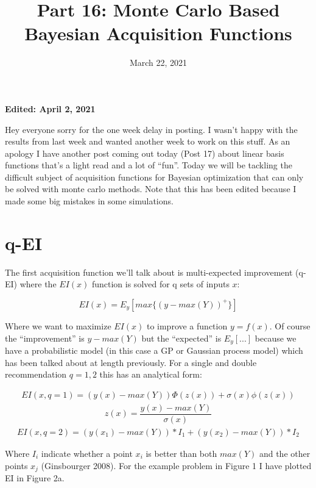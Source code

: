 \documentclass[12pt]{article}
\title{Part 16: Monte Carlo Based Bayesian Acquisition Functions}
\begin{document}
\date{March 22, 2021}
\maketitle

\textbf{Edited: April 2, 2021}

Hey everyone sorry for the one week delay in posting. I wasn't happy with the results from last week and wanted another week to work on this stuff. As an apology I have another post coming out today (Post 17) about linear basis functions that's a light read and a lot of ``fun''. Today we will be tackling the difficult subject of acquisition functions for Bayesian optimization that can only be solved with monte carlo methods. Note that this has been edited because I made some big mistakes in some simulations.

\section{q-EI}

The first acquisition function we'll talk about is multi-expected improvement (q-EI) where the $EI(x)$ function is solved for q sets of inputs $x$:

\begin{equation}
EI(x)=E_y[max\{(y-max(Y))^+\}]
\end{equation}

\vspace{5mm}

Where we want to maximize $EI(x)$ to improve a function $y=f(x)$. Of course the ``improvement'' is $y-max(Y)$ but the ``expected'' is $E_y[...]$ because we have a probabilistic model (in this case a GP or Gaussian process model) which has been talked about at length previously. For a single and double recommendation $q=1,2$ this has an analytical form:

\begin{align*}
EI(x,q=1)=(y(x)-max(Y))\Phi(z(x))+\sigma(x) \phi(z(x))
\end{align*}
\begin{align*}
z(x)=\dfrac{y(x)-max(Y)}{\sigma(x)}
\end{align*}
\begin{align*}
EI(x,q=2)=(y(x_1)-max(Y))*I_1+(y(x_2)-max(Y))*I_2
\end{align*}

\vspace{5mm}

Where $I_i$ indicate whether a point $x_i$ is better than both $max(Y)$ and the other points $x_j$ (Ginsbourger 2008). For the example problem in Figure 1 I have plotted EI in Figure 2a. 
\end{document}
